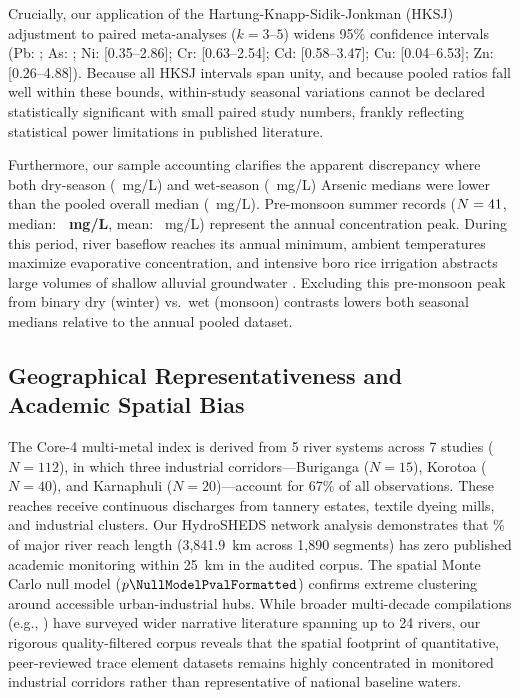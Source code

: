 \documentclass[authoryear,preprint,12pt]{elsarticle}
\begin{document}
Crucially, our application of the Hartung-Knapp-Sidik-Jonkman (HKSJ) adjustment to paired meta-analyses ($k=3\text{--}5$) widens 95\% confidence intervals (Pb: \LeadWithinStudyHksjCi; As: \ArsenicWithinStudyHksjCi; Ni: [0.35--2.86]; Cr: [0.63--2.54]; Cd: [0.58--3.47]; Cu: [0.04--6.53]; Zn: [0.26--4.88]). Because all HKSJ intervals span unity, and because pooled ratios fall well within these bounds, within-study seasonal variations cannot be declared statistically significant with small paired study numbers, frankly reflecting statistical power limitations in published literature.

Furthermore, our sample accounting clarifies the apparent discrepancy where both dry-season (\ArsenicDryMedian~mg/L) and wet-season (\ArsenicWetMedian~mg/L) Arsenic medians were lower than the pooled overall median (\ArsenicOverallMedian~mg/L). Pre-monsoon summer records ($N=41$, median: \textbf{\ArsenicPremonsoonMedian~mg/L}, mean: \ArsenicPremonsoonMean~mg/L) represent the annual concentration peak. During this period, river baseflow reaches its annual minimum, ambient temperatures maximize evaporative concentration, and intensive boro rice irrigation abstracts large volumes of shallow alluvial groundwater \citep{Brammer2009,Halim2015}. Excluding this pre-monsoon peak from binary dry (winter) vs.\ wet (monsoon) contrasts lowers both seasonal medians relative to the annual pooled dataset.

\subsection{Geographical Representativeness and Academic Spatial Bias}
The Core-4 multi-metal index is derived from 5 river systems across 7 studies ($N=112$), in which three industrial corridors—Buriganga ($N=15$), Korotoa ($N=40$), and Karnaphuli ($N=20$)—account for 67\% of all observations. These reaches receive continuous discharges from tannery estates, textile dyeing mills, and industrial clusters. Our HydroSHEDS network analysis demonstrates that \UnsampledPctLengthTwentyFiveKm\% of major river reach length (3,841.9~km across 1,890 segments) has zero published academic monitoring within 25~km in the audited corpus. The spatial Monte Carlo null model ($p \NullModelPvalFormatted$) confirms extreme clustering around accessible urban-industrial hubs. While broader multi-decade compilations (e.g., \citealt{Bilal2023,Proshad2025}) have surveyed wider narrative literature spanning up to 24 rivers, our rigorous quality-filtered corpus reveals that the spatial footprint of quantitative, peer-reviewed trace element datasets remains highly concentrated in monitored industrial corridors rather than representative of national baseline waters.
\end{document}
